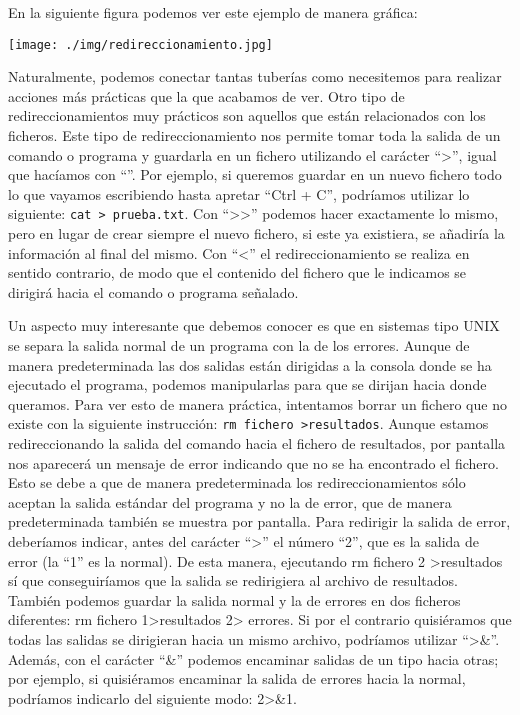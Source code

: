 \documentclass[12pt]{article}
\begin{document}
En la siguiente figura podemos ver este ejemplo de manera gráfica:

\begin{center}
 \texttt{[image: ./img/redireccionamiento.jpg]}
\end{center}


Naturalmente, podemos conectar tantas tuberías como necesitemos para realizar 
acciones más prácticas que la que acabamos de ver. Otro tipo de 
redireccionamientos muy prácticos son aquellos que están relacionados con los 
ficheros. Este tipo de redireccionamiento nos permite tomar toda la salida de 
un comando o programa y guardarla en un fichero utilizando el carácter ``\textgreater'', 
igual que hacíamos con ``\textbar''. Por ejemplo, si queremos guardar en un nuevo 
fichero todo lo que vayamos escribiendo hasta apretar ``Ctrl + C'', podríamos 
utilizar lo siguiente: \texttt{cat > prueba.txt}. Con ``\textgreater \textgreater'' 
podemos hacer exactamente 
lo mismo, pero en lugar de crear siempre el nuevo fichero, si este ya 
existiera, se añadiría la información al final del mismo. Con ``\textless'' el 
redireccionamiento se realiza en sentido contrario, de modo que el 
contenido del fichero que le indicamos se dirigirá hacia el comando o programa 
señalado.

Un aspecto muy interesante que debemos conocer es que en sistemas tipo UNIX 
se separa la salida normal de un programa con la de los errores. Aunque de  
manera predeterminada las dos salidas están dirigidas a la consola donde 
se ha ejecutado el programa, podemos manipularlas para que se dirijan hacia 
donde queramos. Para ver esto de manera práctica, intentamos borrar un fichero 
que no existe con la siguiente instrucción: \texttt{rm fichero \textgreater resultados}. Aunque 
estamos redireccionando la salida del comando hacia el fichero de resultados, 
por pantalla nos aparecerá un mensaje de error indicando que no se ha encontrado 
el fichero. Esto se debe a que de manera predeterminada los redireccionamientos sólo aceptan 
la salida estándar del programa y no la de error, que de manera predeterminada también se 
muestra por pantalla. Para redirigir la salida de error, deberíamos indicar, 
antes del carácter ``\textgreater'' el número ``2'', que es la salida de error (la ``1'' es la 
normal). De esta manera, ejecutando rm fichero 2 \textgreater resultados sí que conseguiríamos
que la salida se redirigiera al archivo de resultados. También podemos guardar 
la salida normal y la de errores en dos ficheros diferentes: rm fichero 1\textgreater resultados 2\textgreater 
errores. Si por el contrario quisiéramos que todas las salidas se dirigieran
 hacia un mismo archivo, podríamos utilizar ``\textgreater\&''. Además, con el carácter ``\&'' 
podemos encaminar salidas de un tipo hacia otras; por ejemplo, si quisiéramos 
encaminar la salida de errores hacia la normal, podríamos indicarlo del 
siguiente modo: 2\textgreater\&1.
\end{document}

